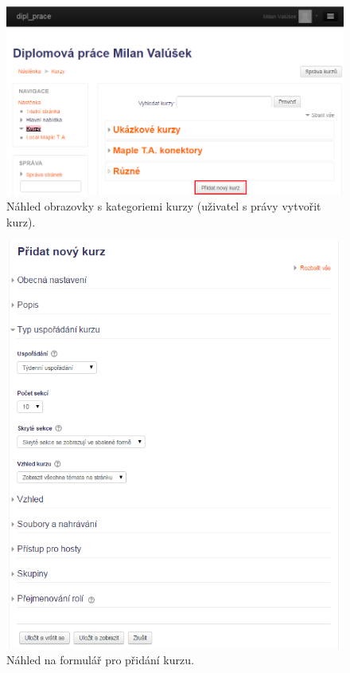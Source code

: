\documentclass[
print,
  11pt,
  table,   
  nolof,    
  nolot,
  oneside,
  draft
]{fithesis3}
\begin{document}
		\begin{figure}
		  \begin{center}
		    \includegraphics[width=120mm]{images/kurzy-pridani.png}
		   \end{center}
		  \caption{Náhled obrazovky s kategoriemi kurzy (uživatel s právy vytvořit kurz).  }
		  \label{fig:moodlekurzypridani}
		\end{figure}

		\begin{figure}
		  \begin{center}
		    \includegraphics[width=120mm]{images/kurzy-pridani-detail.png}
		   \end{center}
		  \caption{Náhled na formulář pro přidání kurzu.}
		  \label{fig:moodlekurzypridanidetail}
		\end{figure}
\end{document}
